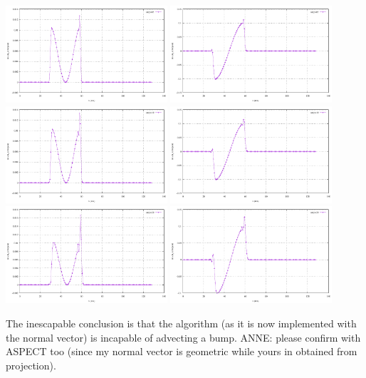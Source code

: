 \begin{center}
\includegraphics[width=6cm]{python_codes/fieldstone_54/images/exp7/n_dov_v_nx_005.pdf}
\includegraphics[width=6cm]{python_codes/fieldstone_54/images/exp7/n_dov_v_ny_005.pdf}\\
\includegraphics[width=6cm]{python_codes/fieldstone_54/images/exp7/n_dov_v_nx_010.pdf}
\includegraphics[width=6cm]{python_codes/fieldstone_54/images/exp7/n_dov_v_ny_010.pdf}\\
\includegraphics[width=6cm]{python_codes/fieldstone_54/images/exp7/n_dov_v_nx_020.pdf}
\includegraphics[width=6cm]{python_codes/fieldstone_54/images/exp7/n_dov_v_ny_020.pdf}
\end{center}

The inescapable conclusion is that the algorithm (as it is now implemented with the normal 
vector) is incapable of advecting a bump. ANNE: please confirm with ASPECT too (since my 
normal vector is geometric while yours in obtained from projection).


